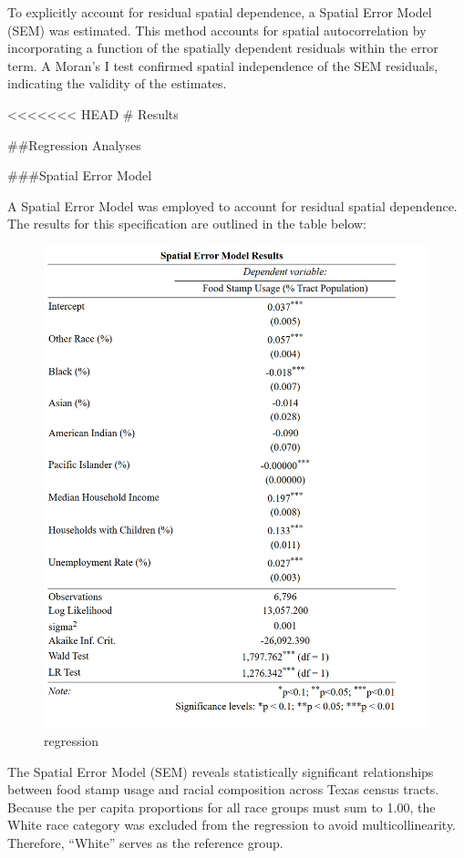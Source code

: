 \documentclass[]{article}
\begin{document}
To explicitly account for residual spatial dependence, a Spatial Error
Model (SEM) was estimated. This method accounts for spatial
autocorrelation by incorporating a function of the spatially dependent
residuals within the error term. A Moran's I test confirmed spatial
independence of the SEM residuals, indicating the validity of the
estimates.

\textless\textless\textless\textless\textless\textless\textless{} HEAD
\# Results

\#\#Regression Analyses

\#\#\#Spatial Error Model

A Spatial Error Model was employed to account for residual spatial
dependence. The results for this specification are outlined in the table
below:

\begin{figure}
\centering
\includegraphics{_figures/screenshot.png}
\caption{regression}
\end{figure}

The Spatial Error Model (SEM) reveals statistically significant
relationships between food stamp usage and racial composition across
Texas census tracts. Because the per capita proportions for all race
groups must sum to 1.00, the White race category was excluded from the
regression to avoid multicollinearity. Therefore, ``White'' serves as
the reference group.
\end{document}
